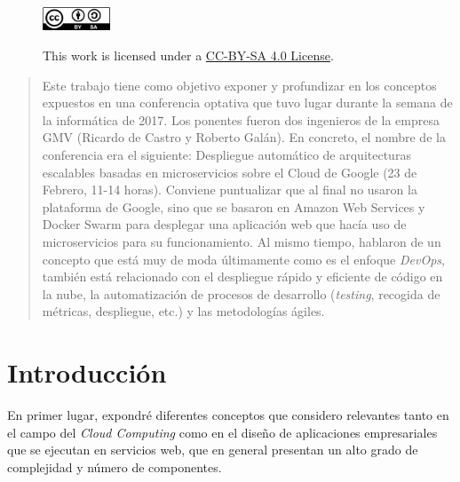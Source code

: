 \begin{titlepage}

\vfill %



\captionsetup[figure]{labelformat=empty,justification=raggedright,singlelinecheck=false}
\begin{figure}[h]

        \includegraphics[width=2cm,keepaspectratio]{cc-by-sa.png}
        \label{fig:by-sa}
        \caption{ This work is licensed under a \href{https://creativecommons.org/licenses/by/4.0/legalcode}{CC-BY-SA 4.0 License}.}

\end{figure}

\end{titlepage}

\tableofcontents
\clearpage

\begin{abstract}
Este trabajo tiene como objetivo exponer y profundizar en los conceptos expuestos en una conferencia optativa que tuvo lugar durante la semana de la informática de 2017. Los ponentes fueron dos ingenieros de la empresa GMV (Ricardo de Castro y Roberto Galán). En concreto, el nombre de la conferencia era el siguiente: Despliegue automático de arquitecturas escalables basadas en microservicios sobre el Cloud de Google (23 de Febrero, 11-14 horas). Conviene puntualizar que al final no usaron la plataforma de Google, sino que se basaron en Amazon Web Services y Docker Swarm para desplegar una aplicación web que hacía uso de microservicios para su funcionamiento. Al mismo tiempo, hablaron de un concepto que está muy de moda últimamente como es el enfoque \emph{DevOps}, también está relacionado con el despliegue rápido y eficiente de código en la nube, la automatización de procesos de desarrollo (\textit{testing}, recogida de métricas, despliegue, etc.) y las metodologías ágiles.
\end{abstract}

\section{Introducción}\label{sec:intro}


En primer lugar, expondré diferentes conceptos que considero relevantes tanto en el campo del \emph{Cloud Computing} como en el diseño de aplicaciones empresariales que se ejecutan en servicios web, que en general presentan un alto grado de complejidad y número de componentes. 

